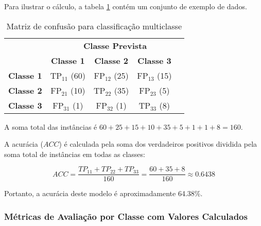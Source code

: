 Para ilustrar o cálculo, a tabela \ref{tab:confusion_matrix_multiclass_example} contém um conjunto de exemplo de dados.

\begin{table}[h]
\centering
\caption{Matriz de confusão para classificação multiclasse}
\label{tab:confusion_matrix_multiclass_example}
\begin{tabular}{c|c|c|c|c}
\multicolumn{1}{c}{} & \multicolumn{4}{c}{\textbf{Classe Prevista}} \\ \cline{2-5} 
\multicolumn{1}{c|}{} & \textbf{Classe 1} & \textbf{Classe 2} & \textbf{Classe 3} \\ \hline
\rowcolor{red!25} \textbf{Classe 1} & \cellcolor{green!25}TP$_{11}$ (60) & \cellcolor{red!25}FP$_{12}$ (25) & \cellcolor{red!25}FP$_{13}$ (15) \\ \hline
\rowcolor{red!25} \textbf{Classe 2} & \cellcolor{red!25}FP$_{21}$ (10) & \cellcolor{green!25}TP$_{22}$ (35) & \cellcolor{red!25}FP$_{23}$ (5) \\ \hline
\rowcolor{red!25} \textbf{Classe 3} & \cellcolor{red!25}FP$_{31}$ (1) & \cellcolor{red!25}FP$_{32}$ (1) & \cellcolor{green!25}TP$_{33}$ (8) \\ \hline
\end{tabular}
\end{table}

A soma total das instâncias é \(60 + 25 + 15 + 10 + 35 + 5 + 1 + 1 + 8 = 160\).

A acurácia (\(ACC\)) é calculada pela soma dos verdadeiros positivos dividida pela soma total de instâncias em todas as classes:

\[ ACC = \frac{TP_{11} + TP_{22} + TP_{33}}{160} = \frac{60 + 35 + 8}{160} \approx 0.6438 \]

Portanto, a acurácia deste modelo é aproximadamente 64.38\%.

\subsubsection{Métricas de Avaliação por Classe com Valores Calculados}

